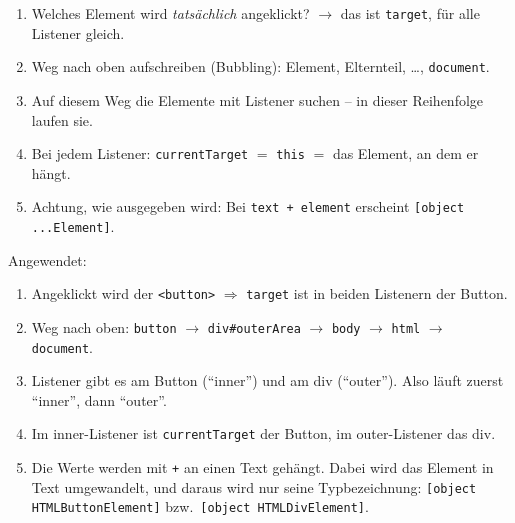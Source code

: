 \documentclass[a4paper,11pt]{article}
\begin{document}
\begin{merkbox}[title={Strategie: Event-Ausgaben vorhersagen}]
\begin{enumerate}[nosep]
\item Welches Element wird \emph{tatsächlich} angeklickt? $\to$ das ist \texttt{target}, für alle Listener gleich.
\item Weg nach oben aufschreiben (Bubbling): Element, Elternteil, \dots, \texttt{document}.
\item Auf diesem Weg die Elemente mit Listener suchen -- in dieser Reihenfolge laufen sie.
\item Bei jedem Listener: \texttt{currentTarget} $=$ \texttt{this} $=$ das Element, an dem er hängt.
\item Achtung, wie ausgegeben wird: Bei \texttt{\textquotedbl{}text\textquotedbl{} + element} erscheint \texttt{[object ...Element]}.
\end{enumerate}
\end{merkbox}

Angewendet:
\begin{enumerate}
\item Angeklickt wird der \texttt{<button>} $\Rightarrow$ \texttt{target} ist in beiden Listenern der Button.
\item Weg nach oben: \texttt{button} $\to$ \texttt{div\#outerArea} $\to$ \texttt{body} $\to$ \texttt{html} $\to$ \texttt{document}.
\item Listener gibt es am Button ("`inner"') und am div ("`outer"'). Also läuft zuerst "`inner"', dann "`outer"'.
\item Im inner-Listener ist \texttt{currentTarget} der Button, im outer-Listener das div.
\item Die Werte werden mit \texttt{+} an einen Text gehängt. Dabei wird das Element in Text umgewandelt, und
      daraus wird nur seine Typbezeichnung: \texttt{[object HTMLButtonElement]} bzw.\ \texttt{[object HTMLDivElement]}.
\end{enumerate}
\end{document}
